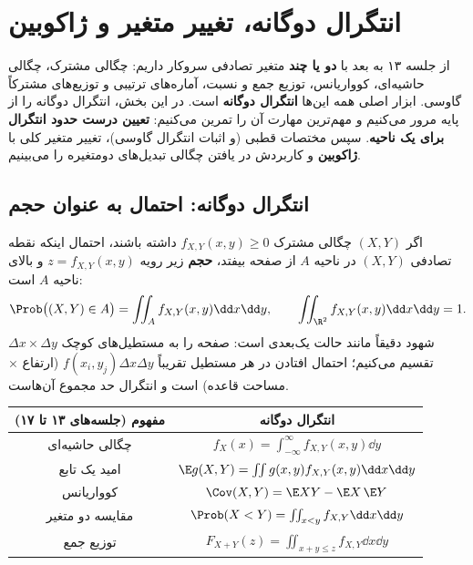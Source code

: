 \chapter{انتگرال دوگانه، تغییر متغیر و ژاکوبین}

از جلسه ۱۳ به بعد با \textbf{دو یا چند} متغیر تصادفی سروکار داریم: چگالی مشترک، چگالی حاشیه‌ای، کوواریانس، توزیع جمع و نسبت، آماره‌های ترتیبی و توزیع‌های مشترکاً گاوسی. ابزار اصلی همه این‌ها \textbf{انتگرال دوگانه} است. در این بخش، انتگرال دوگانه را از پایه مرور می‌کنیم و مهم‌ترین مهارت آن را تمرین می‌کنیم: \textbf{تعیین درست حدود انتگرال برای یک ناحیه}. سپس مختصات قطبی (و اثبات انتگرال گاوسی)، تغییر متغیر کلی با \textbf{ژاکوبین} و کاربردش در یافتن چگالی تبدیل‌های دومتغیره را می‌بینیم.

\section{انتگرال دوگانه: احتمال به عنوان حجم}
اگر $(X,Y)$ چگالی مشترک $f_{X,Y}(x,y)\ge0$ داشته باشند، احتمال اینکه نقطه تصادفی $(X,Y)$ در ناحیه $A$ از صفحه بیفتد، \textbf{حجم} زیر رویه $z=f_{X,Y}(x,y)$ و بالای ناحیه $A$ است:
\[
\Prob\big((X,Y)\in A\big)=\iint_Af_{X,Y}(x,y)\dd x\dd y,\qquad \iint_{\R^2}f_{X,Y}(x,y)\dd x\dd y=1 .
\]
شهود دقیقاً مانند حالت یک‌بعدی است: صفحه را به مستطیل‌های کوچک $\Delta x\times\Delta y$ تقسیم می‌کنیم؛ احتمال افتادن در هر مستطیل تقریباً $f(x_i,y_j)\Delta x\Delta y$ (ارتفاع × مساحت قاعده) است و انتگرال حد مجموع آن‌هاست.

\begin{center}
\renewcommand{\arraystretch}{1.6}
\begin{tabular}{c|c}
مفهوم (جلسه‌های ۱۳ تا ۱۷) & انتگرال دوگانه\\\hline
چگالی حاشیه‌ای & $f_X(x)=\int_{-\infty}^{\infty}f_{X,Y}(x,y)\dd y$\\
امید یک تابع & $\E g(X,Y)=\iint g(x,y)f_{X,Y}(x,y)\dd x\dd y$\\
کوواریانس & $\Cov(X,Y)=\E XY-\E X\,\E Y$\\
مقایسه دو متغیر & $\Prob(X<Y)=\iint_{x<y}f_{X,Y}\dd x\dd y$\\
توزیع جمع & $F_{X+Y}(z)=\iint_{x+y\le z}f_{X,Y}\dd x\dd y$
\end{tabular}
\end{center}

